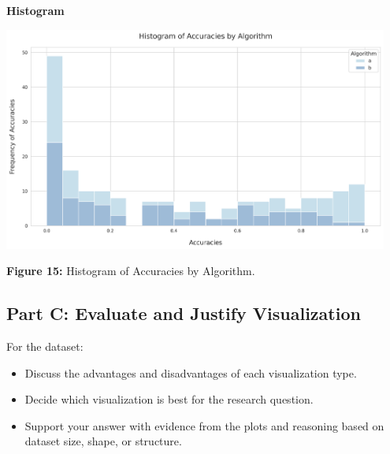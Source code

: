 \textbf{Histogram}
\begin{center}
  \includegraphics[width=0.95\textwidth]{figures/algo_accuracy_by_epoch_histogram_plot.png}
  
  \textbf{Figure 15:} Histogram of Accuracies by Algorithm.
\end{center}
\newpage

\subsection{Part C: Evaluate and Justify Visualization}
For the dataset:
\begin{itemize}
    \item Discuss the advantages and disadvantages of each visualization type.
    \item Decide which visualization is best for the research question.
    \item Support your answer with evidence from the plots and reasoning based on dataset size, shape, or structure.
\end{itemize}
